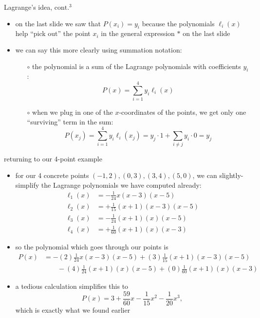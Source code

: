 \documentclass[10pt,hyperref]{beamer}
\begin{document}
\begin{frame}{Lagrange's idea, $\text{cont.}^3$}

\begin{itemize}
\item on the last slide we saw that $P(x_i)=y_i$ because the polynomials $\ell_i(x)$ help ``pick out'' the point $x_i$ in the general expression $\ast$ on the last slide
\item we can say this more clearly using summation notation:
  \begin{itemize}
  \item[$\circ$] the polynomial is a sum of the Lagrange polynomials with coefficients $y_i$:
	$$P(x) = \sum_{i=1}^4 y_i \ell_i(x)$$
  \item[$\circ$] when we plug in one of the $x$-coordinates of the points, we get only one ``surviving'' term in the sum:
	$$P(x_j) = \sum_{i=1}^4 y_i \ell_i(x_j) = y_j\cdot 1 + \sum_{i\ne j} y_i \cdot 0 = y_j$$
  
  \end{itemize}
\end{itemize}
\end{frame}


\begin{frame}{returning to our 4-point example}

\begin{itemize}
\item for our 4 concrete points $(-1,2), (0,3), (3,4), (5,0)$, we can slightly-simplify the Lagrange polynomials we have  computed already:
\small
\begin{align*}
\ell_{1}(x) &= - \frac{1}{24} x (x-3) (x-5) \\
\ell_{2}(x) &= + \frac{1}{15} (x+1) (x-3) (x-5) \\
\ell_{3}(x) &= - \frac{1}{24} (x+1) (x) (x-5) \\
\ell_{4}(x) &= + \frac{1}{60} (x+1) (x) (x-3)
\end{align*}
\normalsize
\item so the polynomial which goes through our points is
\small
\begin{align*}
P(x) &= - (2) \frac{1}{24} x (x-3) (x-5) + (3) \frac{1}{15} (x+1) (x-3) (x-5) \\ 
     &\qquad - (4) \frac{1}{24} (x+1) (x) (x-5) + (0) \frac{1}{60} (x+1) (x) (x-3)
\end{align*}
\normalsize
\item a tedious calculation simplifies this to
	$$P(x)=3 + \frac{59}{60} x - \frac{1}{15} x^2 - \frac{1}{20} x^3,$$
which is exactly what we found earlier
\end{itemize}
\end{frame}
\end{document}
